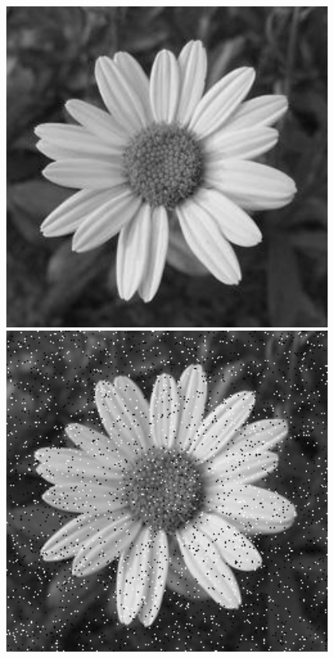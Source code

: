 \documentclass[a4paper]{report}
\begin{document}
\begin{figure}[H]
\centering
\begin{minipage}{.3\textwidth}
  \centering
    \includegraphics[width=0.95\textwidth]{images/Smooth/flower.jpg}
\end{minipage}%
\begin{minipage}{.3\textwidth}
  \centering
    \includegraphics[width=0.95\textwidth]{images/Smooth/flower_salt-n-pepper_0.05.png}

\end{minipage}
\end{figure}
\end{document}
